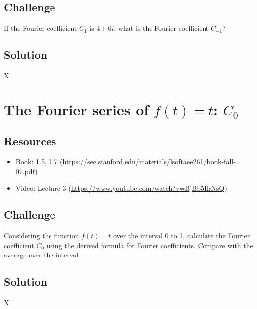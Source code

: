\subsection*{Challenge}
If the Fourier coefficient $C_1$ is $4 + 6i$, what is the Fourier coefficient $C_{-1}$?

\subsection*{Solution}
X


\timebox





\newpage

\section{The Fourier series of $f(t)=t$: $C_0$}

\subsection*{Resources}
\begin{itemize}
    \item Book: 1.5, 1.7 (\url{https://see.stanford.edu/materials/lsoftaee261/book-fall-07.pdf})
    \item Video: Lecture 3 (\url{https://www.youtube.com/watch?v=BjBb5IlrNsQ})
\end{itemize}

\subsection*{Challenge}
Considering the function $f(t)=t$ over the interval 0 to 1, calculate the Fourier coefficient $C_0$ using the derived formula for Fourier coefficients. Compare with the average over the interval.

\subsection*{Solution}
X


\timebox




\newpage

